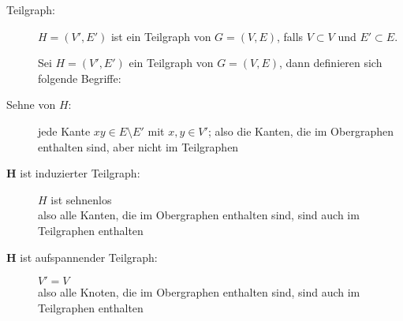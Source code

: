 \documentclass[%
a4paper, %
9pt,              %
leqno,            %
fleqn,            %
]
{scrartcl}
\begin{document}
\begin{description}
  \item[Teilgraph:] $H = (V', E')$ ist ein Teilgraph von $G = (V,E)$, falls $V
    \subset V$ und $E' \subset E$.

  Sei $H = (V', E')$ ein Teilgraph von $G = (V,E)$, dann definieren sich
  folgende Begriffe:

  \item[Sehne von $H$:] jede Kante $xy \in E \setminus E'$ mit $x,y \in V'$;
    also die Kanten, die im Obergraphen enthalten sind, aber nicht im Teilgraphen
  \item[$\mathbf{H}$ ist induzierter Teilgraph:] $H$ ist sehnenlos\\
    also alle Kanten, die im Obergraphen enthalten sind, sind auch im
    Teilgraphen enthalten
  \item[$\mathbf{H}$ ist aufspannender Teilgraph:] $V' = V$\\
    also alle Knoten, die im Obergraphen enthalten sind, sind auch im
    Teilgraphen enthalten


\end{description}
\end{document}
